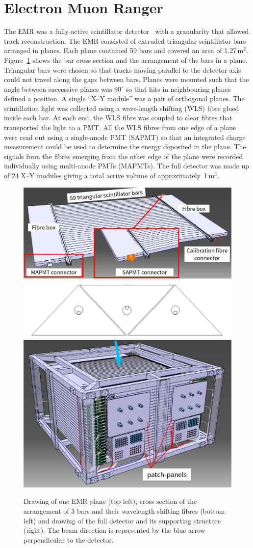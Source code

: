 \graphicspath{{05-EMR/Figures/}}

\section{Electron Muon Ranger}
\label{Sect:EMR}

The EMR was a fully-active scintillator
detector~\cite{2016JInst..11T10007} with a granularity that allowed track reconstruction.
The EMR consisted of extruded triangular scintillator bars arranged in
planes.
Each plane contained 59 bars and covered an area of 1.27\,m$^2$.
Figure~\ref{fig:EMR} shows the bar cross section and the arrangement of the
bars in a plane.
Triangular bars were chosen so that tracks moving parallel to the
detector axis could not travel along the gaps between bars. 
Planes were mounted such that the angle between successive planes was
$90^{\circ}$ so that hits in neighbouring planes defined a position.
A single ``X--Y module'' was a pair of orthogonal planes.
The scintillation light was collected using a wave-length shifting
(WLS) fibre glued inside each bar.
At each end, the WLS fibre was coupled to clear fibres that
transported the light to a PMT.
All the WLS fibres from one edge of a plane were read out using a
single-anode PMT (SAPMT) so that an integrated charge measurement could be
used to determine the energy deposited in the plane.
The signals from the fibres emerging from the other edge of the plane
were recorded individually using multi-anode PMTs (MAPMTs). 
The full detector was made up of 24 X--Y modules giving a total active 
volume of approximately~1\,m$^3$.
\begin{figure}[htb!]
  \begin{center}
    \includegraphics[width=0.465\columnwidth]{EMR1-edited.png}
    \hfill
    \includegraphics[width=0.515\columnwidth]{EMR2-with_beam.png}
  \end{center}
  \caption{
    Drawing of one EMR plane (top left), cross section of the
    arrangement of 3 bars and their wavelength shifting fibres (bottom
    left) and drawing of the full detector and its supporting
    structure (right).
    The beam direction is represented by the blue arrow perpendicular to the detector.
  }
  \label{fig:EMR}
\end{figure}


